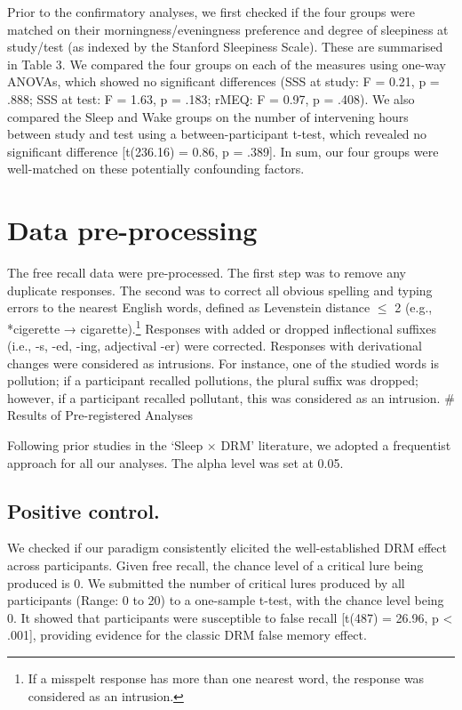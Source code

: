 \documentclass[
]{article}
\begin{document}
Prior to the confirmatory analyses, we first checked if the four groups were matched on their morningness/eveningness preference and degree of sleepiness at study/test (as indexed by the Stanford Sleepiness Scale). These are summarised in Table 3. We compared the four groups on each of the measures using one-way ANOVAs, which showed no significant differences (SSS at study: F = 0.21, p = .888; SSS at test: F = 1.63, p = .183; rMEQ: F = 0.97, p = .408). We also compared the Sleep and Wake groups on the number of intervening hours between study and test using a between-participant t-test, which revealed no significant difference {[}t(236.16) = 0.86, p = .389{]}. In sum, our four groups were well-matched on these potentially confounding factors.

\hypertarget{data-pre-processing}{%
\section{Data pre-processing}\label{data-pre-processing}}

The free recall data were pre-processed. The first step was to remove any duplicate responses. The second was to correct all obvious spelling and typing errors to the nearest English words, defined as Levenstein distance \(\leq\) 2 (e.g., *cigerette → cigarette).\footnote{If a misspelt response has more than one nearest word, the response was considered as an intrusion.} Responses with added or dropped inflectional suffixes (i.e., -s, -ed, -ing, adjectival -er) were corrected. Responses with derivational changes were considered as intrusions. For instance, one of the studied words is pollution; if a participant recalled pollutions, the plural suffix was dropped; however, if a participant recalled pollutant, this was considered as an intrusion.
\# Results of Pre-registered Analyses

Following prior studies in the `Sleep \(\times\) DRM' literature, we adopted a frequentist approach for all our analyses. The alpha level was set at 0.05.

\hypertarget{positive-control.}{%
\subsection{Positive control.}\label{positive-control.}}

We checked if our paradigm consistently elicited the well-established DRM effect across participants. Given free recall, the chance level of a critical lure being produced is 0. We submitted the number of critical lures produced by all participants (Range: 0 to 20) to a one-sample t-test, with the chance level being 0. It showed that participants were susceptible to false recall {[}t(487) = 26.96, p \textless{} .001{]}, providing evidence for the classic DRM false memory effect.
\end{document}
